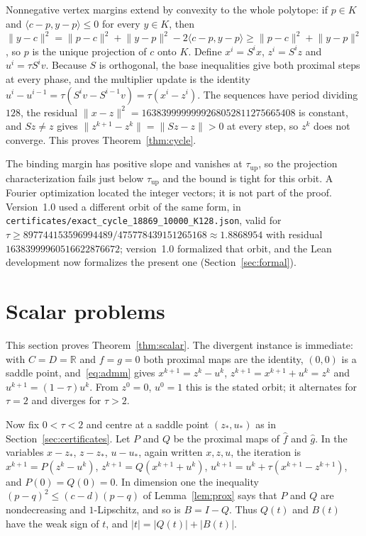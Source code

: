 \documentclass[11pt]{article}
\numberwithin{equation}{section}
\theoremstyle{definition}
\theoremstyle{remark}
\newcommand{\R}{\mathbb R}
\newcommand{\ip}[2]{\langle #1,#2\rangle}
\newcommand{\norm}[1]{\lVert #1\rVert}
\newcommand{\lean}[1]{{\urlstyle{tt}\nolinkurl{#1}}}
\newcommand{\tauup}{\tau_{\mathrm{up}}}
\begin{document}
Nonnegative vertex margins extend by convexity to the whole polytope: if $p\in K$ and $\ip{c-p}{y-p}\le0$ for every $y\in K$, then $\norm{y-c}^2=\norm{p-c}^2+\norm{y-p}^2-2\ip{c-p}{y-p}\ge\norm{p-c}^2+\norm{y-p}^2$, so $p$ is the unique projection of $c$ onto $K$. Define $x^i=S^ix$, $z^i=S^iz$ and $u^i=\tau S^iv$. Because $S$ is orthogonal, the base inequalities give both proximal steps at every phase, and the multiplier update is the identity $u^i-u^{i-1}=\tau(S^iv-S^{i-1}v)=\tau(x^i-z^i)$. The sequences have period dividing $128$, the residual $\norm{x-z}^2=1638399999999268052811275665408$ is constant, and $Sz\ne z$ gives $\norm{z^{k+1}-z^k}=\norm{Sz-z}>0$ at every step, so $z^k$ does not converge. This proves Theorem~\ref{thm:cycle}.

The binding margin has positive slope and vanishes at $\tauup$, so the projection characterization fails just below $\tauup$ and the bound is tight for this orbit. A Fourier optimization located the integer vectors; it is not part of the proof. Version~1.0 used a different orbit of the same form, in \lean{certificates/exact_cycle_18869_10000_K128.json}, valid for $\tau\ge897744153596994489/475778439151265168\approx1.8868954$ with residual $16383999960516622876672$; version~1.0 formalized that orbit, and the Lean development now formalizes the present one (Section~\ref{sec:formal}).

\section{Scalar problems}\label{sec:scalar}
This section proves Theorem~\ref{thm:scalar}. The divergent instance is immediate: with $C=D=\R$ and $f=g=0$ both proximal maps are the identity, $(0,0)$ is a saddle point, and~\eqref{eq:admm} gives $x^{k+1}=z^k-u^k$, $z^{k+1}=x^{k+1}+u^k=z^k$ and $u^{k+1}=(1-\tau)u^k$. From $z^0=0$, $u^0=1$ this is the stated orbit; it alternates for $\tau=2$ and diverges for $\tau>2$.

Now fix $0<\tau<2$ and centre at a saddle point $(z_*,u_*)$ as in Section~\ref{sec:certificates}. Let $P$ and $Q$ be the proximal maps of $\widehat f$ and $\widehat g$. In the variables $x-z_*$, $z-z_*$, $u-u_*$, again written $x,z,u$, the iteration is $x^{k+1}=P(z^k-u^k)$, $z^{k+1}=Q(x^{k+1}+u^k)$, $u^{k+1}=u^k+\tau(x^{k+1}-z^{k+1})$, and $P(0)=Q(0)=0$. In dimension one the inequality $(p-q)^2\le(c-d)(p-q)$ of Lemma~\ref{lem:prox} says that $P$ and $Q$ are nondecreasing and $1$-Lipschitz, and so is $B=I-Q$. Thus $Q(t)$ and $B(t)$ have the weak sign of $t$, and $\lvert t\rvert=\lvert Q(t)\rvert+\lvert B(t)\rvert$.
\end{document}
